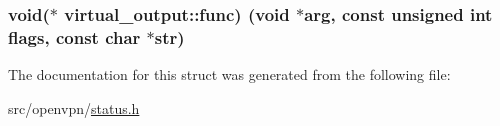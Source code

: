 \subsubsection[{func}]{\setlength{\rightskip}{0pt plus 5cm}void($\ast$ virtual\+\_\+output\+::func) (void $\ast${\bf arg}, const unsigned int flags, const char $\ast$str)}\label{structvirtual__output_ab0b2c2556a9e7b564f54c756ee94b270}


The documentation for this struct was generated from the following file\+:\begin{DoxyCompactItemize}
\item 
src/openvpn/\hyperlink{status_8h}{status.\+h}\end{DoxyCompactItemize}
